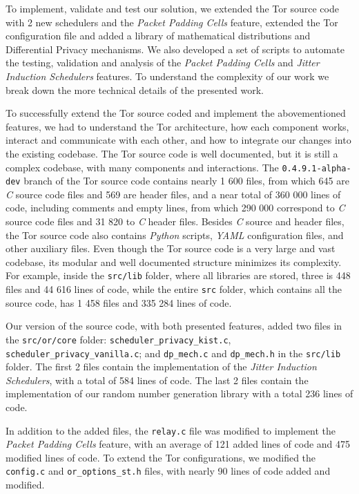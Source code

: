 To implement, validate and test our solution, we extended the Tor source code with 2 new schedulers and the \textit{Packet Padding Cells} feature, extended the Tor configuration file and added a library of mathematical distributions and Differential Privacy mechanisms. We also developed a set of scripts to automate the testing, validation and analysis of the \textit{Packet Padding Cells} and \textit{Jitter Induction Schedulers} features. To understand the complexity of our work we break down the more technical details of the presented work.

To successfully extend the Tor source coded and implement the abovementioned features, we had to understand the Tor architecture, how each component works, interact and communicate with each other, and how to integrate our changes into the existing codebase. The Tor source code is well documented, but it is still a complex codebase, with many components and interactions. The \texttt{0.4.9.1-alpha-dev} branch of the Tor source code contains nearly 1 600 files, from which 645 are \textit{C} source code files and 569 are header files, and a near total of 360 000 lines of code, including comments and empty lines, from which 290 000 correspond to \textit{C} source code files and 31 820 to \textit{C} header files. Besides \textit{C} source and header files, the Tor source code also contains \textit{Python} scripts, \textit{YAML} configuration files, and other auxiliary files. Even though the Tor source code is a very large and vast codebase, its modular and well documented structure minimizes its complexity. For example, inside the \texttt{src/lib} folder, where all libraries are stored, three is 448 files and 44 616 lines of code, while the entire \texttt{src} folder, which contains all the source code, has 1 458 files and 335 284 lines of code. 

Our version of the source code, with both presented features, added two files in the \texttt{src/or/core} folder: \texttt{scheduler\_privacy\_kist.c}, \texttt{scheduler\_privacy\_vanilla.c}; and \texttt{dp\_mech.c} and \texttt{dp\_mech.h} in the \texttt{src/lib} folder. The first 2 files contain the implementation of the \textit{Jitter Induction Schedulers}, with a total of 584 lines of code. The last 2 files contain the implementation of our random number generation library with a total 236 lines of code.

In addition to the added files, the \texttt{relay.c} file was modified to implement the \textit{Packet Padding Cells} feature, with an average of 121 added lines of code and 475 modified lines of code. To extend the Tor configurations, we modified the \texttt{config.c} and \texttt{or\_options\_st.h} files, with nearly 90 lines of code added and modified. 

